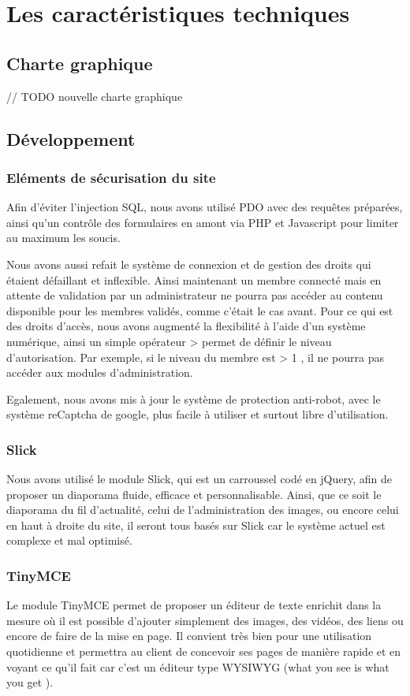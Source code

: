 \documentclass[11pt]{report}
\begin{document}
\chapter{Les caractéristiques techniques}
\section{Charte graphique}
// TODO nouvelle charte graphique
\section{Développement}
\subsection{Eléments de sécurisation du site}
Afin d'éviter l'injection SQL, nous avons utilisé PDO avec des requêtes
préparées, ainsi qu'un contrôle des formulaires en amont via PHP et Javascript
pour limiter au maximum les soucis. \\
\par Nous avons aussi refait le système de connexion et de gestion des droits
qui étaient défaillant et inflexible. Ainsi maintenant un membre connecté mais
en attente de validation par un administrateur ne pourra pas accéder au contenu
disponible pour les membres validés, comme c'était le cas avant. Pour ce qui est
des droits d'accès, nous avons augmenté la flexibilité à l'aide d'un système
numérique, ainsi un simple opérateur \og > \fg{} permet de définir le niveau
d'autorisation. Par exemple, si le niveau du membre est \og > 1 \fg{}, il ne
pourra pas accéder aux modules d'administration. \\
 \par Egalement, nous avons mis à jour le système de protection anti-robot, avec
 le système reCaptcha de google, plus facile à utiliser et surtout libre 
 d'utilisation.
\subsection{Slick}
Nous avons utilisé le module Slick, qui est un carroussel codé en jQuery, afin
de proposer un diaporama fluide, efficace et personnalisable. Ainsi, que ce soit
le diaporama du fil d'actualité, celui de l'administration des images, ou encore
celui en haut à droite du site, il seront tous basés sur Slick car le système
actuel est complexe et mal optimisé.

\subsection{TinyMCE}
Le module TinyMCE permet de proposer un éditeur de texte enrichit dans la mesure
où il est possible d'ajouter simplement des images, des vidéos, des liens ou
encore de faire de la mise en page. Il convient très bien pour une utilisation
quotidienne et permettra au client de concevoir ses pages de manière rapide et
en voyant ce qu'il fait car c'est un éditeur type \og WYSIWYG \fg{} (\og what you
see is what you get \fg{}).
\end{document}
